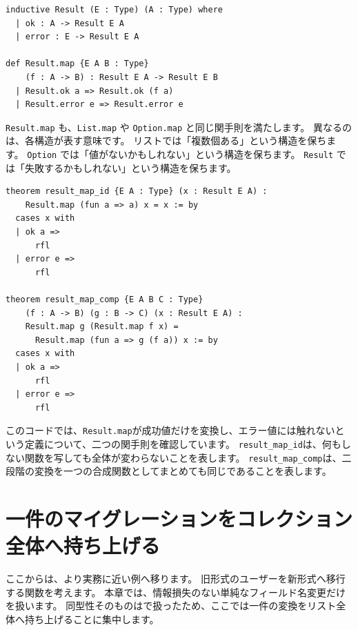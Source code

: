 \begin{listing}[htbp]
\begin{verbatim}
inductive Result (E : Type) (A : Type) where
  | ok : A -> Result E A
  | error : E -> Result E A

def Result.map {E A B : Type}
    (f : A -> B) : Result E A -> Result E B
  | Result.ok a => Result.ok (f a)
  | Result.error e => Result.error e
\end{verbatim}
\caption{\texttt{Result.map}}
\label{lst:ch14_result_map}
\end{listing}

\texttt{Result.map} も、\texttt{List.map} や \texttt{Option.map} と同じ関手則を満たします。
異なるのは、各構造が表す意味です。
リストでは「複数個ある」という構造を保ちます。
\texttt{Option} では「値がないかもしれない」という構造を保ちます。
\texttt{Result} では「失敗するかもしれない」という構造を保ちます。

\begin{listing}[htbp]
\begin{verbatim}
theorem result_map_id {E A : Type} (x : Result E A) :
    Result.map (fun a => a) x = x := by
  cases x with
  | ok a =>
      rfl
  | error e =>
      rfl

theorem result_map_comp {E A B C : Type}
    (f : A -> B) (g : B -> C) (x : Result E A) :
    Result.map g (Result.map f x) =
      Result.map (fun a => g (f a)) x := by
  cases x with
  | ok a =>
      rfl
  | error e =>
      rfl
\end{verbatim}
\caption{\texttt{result\_map\_id} と \texttt{result\_map\_comp}}
\label{lst:ch14_result_map_laws}
\end{listing}

このコードでは、\texttt{Result.map}が成功値だけを変換し、エラー値には触れないという定義について、二つの関手則を確認しています。
\texttt{result\_map\_id}は、何もしない関数を写しても全体が変わらないことを表します。
\texttt{result\_map\_comp}は、二段階の変換を一つの合成関数としてまとめても同じであることを表します。

\section{一件のマイグレーションをコレクション全体へ持ち上げる}

ここからは、より実務に近い例へ移ります。
旧形式のユーザーを新形式へ移行する関数を考えます。
本章では、情報損失のない単純なフィールド名変更だけを扱います。
同型性そのものはで扱ったため、ここでは一件の変換をリスト全体へ持ち上げることに集中します。

